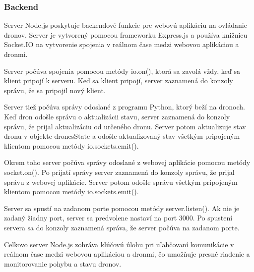 \subsubsection{Backend}
Server Node.js poskytuje backendové funkcie pre webovú aplikáciu na ovládanie dronov. Server je vytvorený pomocou frameworku Express.js a používa knižnicu Socket.IO na vytvorenie spojenia v reálnom čase medzi webovou aplikáciou a dronmi.

Server počúva spojenia pomocou metódy io.on(), ktorá sa zavolá vždy, keď sa klient pripojí k serveru. Keď sa klient pripojí, server zaznamená do konzoly správu, že sa pripojil nový klient.

Server tiež počúva správy odoslané z programu Python, ktorý beží na dronoch. Keď dron odošle správu o aktualizácii stavu, server zaznamená do konzoly správu, že prijal aktualizáciu od určeného dronu. Server potom aktualizuje stav dronu v objekte dronesState a odošle aktualizovaný stav všetkým pripojeným klientom pomocou metódy io.sockets.emit().

Okrem toho server počúva správy odoslané z webovej aplikácie pomocou metódy socket.on(). Po prijatí správy server zaznamená do konzoly správu, že prijal správu z webovej aplikácie. Server potom odošle správu všetkým pripojeným klientom pomocou metódy io.sockets.emit().

Server sa spustí na zadanom porte pomocou metódy server.listen(). Ak nie je zadaný žiadny port, server sa predvolene nastaví na port 3000. Po spustení servera sa do konzoly zaznamená správa, že server počúva na zadanom porte.

Celkovo server Node.js zohráva kľúčovú úlohu pri uľahčovaní komunikácie v reálnom čase medzi webovou aplikáciou a dronmi, čo umožňuje presné riadenie a monitorovanie pohybu a stavu dronov.